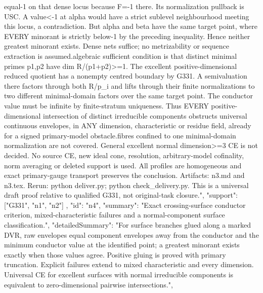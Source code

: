 \documentclass[11pt]{article}
\begin{document}
\begin{Full422Data}
{{equal-1 on that dense locus because F=-1 there. Its normalization pullback is USC. A value<-1 at alpha would have a strict sublevel neighbourhood meeting this locus, a contradiction. But alpha and beta have the same target point, where EVERY minorant is strictly below-1 by the preceding inequality. Hence neither greatest minorant exists. Dense nets suffice; no metrizability or sequence extraction is assumed.\n\nAn algebraic sufficient condition is that distinct minimal primes p1,p2 have dim R/(p1+p2)>=1. The excellent positive-dimensional reduced quotient has a nonempty centred boundary by G331. A semivaluation there factors through both R/p_i and lifts through their finite normalizations to two different minimal-domain factors over the same target point. The conductor value must be infinite by finite-stratum uniqueness. Thus EVERY positive-dimensional intersection of distinct irreducible components obstructs universal continuous envelopes, in ANY dimension, characteristic or residue field, already for a signed primary-model obstacle.\n\nNonsingleton fibres confined to one minimal-domain normalization are not covered. General excellent normal dimension>=3 CE is not decided. No source CE, new ideal cone, resolution, arbitrary-model cofinality, norm averaging or deleted support is used. All profiles are homogeneous and exact primary-gauge transport preserves the conclusion. Artifacts: n3.md and n3.tex. Rerun: python deliver.py; python check_delivery.py. This is a universal draft proof relative to qualified G331, not original-task closure.",
      "support": ["G331", "n1", "n2"]
    },
    {
      "id": "n4",
      "summary": "Exact crossing-surface conductor criterion, mixed-characteristic failures and a normal-component surface classification.",
      "detailedSummary": "For surface branches glued along a marked DVR, raw envelopes equal component envelopes away from the conductor and the minimum conductor value at the identified point; a greatest minorant exists exactly when those values agree. Positive gluing is proved with primary truncation. Explicit failures extend to mixed characteristic and every dimension. Universal CE for excellent surfaces with normal irreducible components is equivalent to zero-dimensional pairwise intersections.",
}}
\end{Full422Data}
\end{document}

